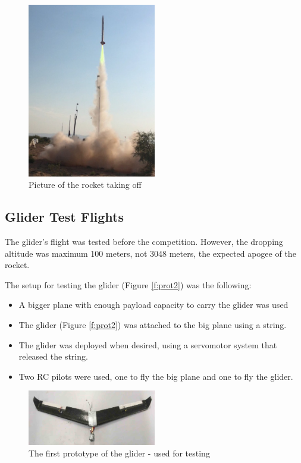 \begin{figure}[h!]
    \centering
        \includegraphics[width=0.5\textwidth]{img/roro_takeoff.jpg}
        \caption{Picture of the rocket taking off}
        \label{f:roro_launch_pic}
 \end{figure}


\subsection{Glider Test Flights}

The glider's flight was tested before the competition. However, the dropping altitude was maximum 100 meters, not 3048 meters, the expected apogee of the rocket.

The setup for testing the glider (Figure \ref{f:prot2}) was the following:
\begin{itemize}
    \item A bigger plane with enough payload capacity to carry the glider was used
    \item The glider (Figure \ref{f:prot2}) was attached to the big plane using a string.
    \item The glider was deployed when desired, using a servomotor system that released the string.
    \item Two RC pilots were used, one to fly the big plane and one to fly the glider.
\end{itemize}

\begin{figure}[h!]
    \centering
        \includegraphics[width=0.5\textwidth]{img/prototype1.jpg}
        \caption{The first prototype of the glider - used for testing}
        \label{f:prot1}
 \end{figure}


